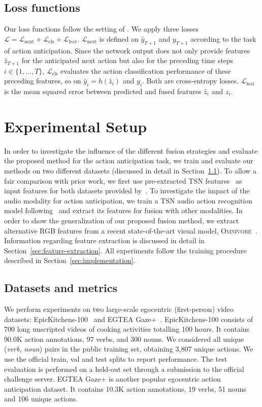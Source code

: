 \documentclass[10pt,twocolumn,letterpaper,dvipsnames]{article}
\begin{document}
\subsection{Loss functions}
\label{sec:losses}
Our loss functions follow the setting of \cite{girdharAnticipativeVideoTransformer2021}. We apply three losses $\mathcal{L} = \mathcal{L}_\mathrm{next} + \mathcal{L}_\mathrm{cls} + \mathcal{L}_\mathrm{feat}$.
$\mathcal{L}_\mathrm{next}$ is defined on $\hat{y}_{T+1}$ and $y_{T+1}$ according to the task of action anticipation. Since the network output does not only provide features $\hat{z}_{T+1}$ for the anticipated next action but also for the preceding time steps $i \in \{1,\dots,T\}$,   $\mathcal{L}_\mathrm{cls}$ evaluates the action classification performance of these preceding features, so on $\hat{y}_{i}=h(\hat{z}_i)$ and $y_{i}$. Both are cross-entropy losses. $\mathcal{L}_\mathrm{feat}$ is the mean squared error between predicted and fused features $\hat{z}_{i}$ and $z_i$.
 \section{Experimental Setup}
In order to investigate the influence of the different fusion strategies and evaluate the proposed method for the action anticipation task, we train and evaluate our methods on two different datasets (discussed in detail in Section~\ref{sec:datasets}). To allow a fair comparison with prior work, we first use pre-extracted TSN features~\cite{wangTemporalSegmentNetworks2016} as input features for both datasets provided by~\cite{furnariWhatWouldYou2019}. To investigate the impact of the audio modality for action anticipation, we train a TSN audio action recognition model following~\cite{kazakosEPICFusionAudioVisualTemporal2019} and extract its features for fusion with other modalities. In order to show the generalization of our proposed fusion method, we extract alternative RGB features from a recent state-of-the-art visual model, \textsc{Omnivore}~\cite{girdharOmnivoreSingleModel2022}. Information regarding feature extraction is discussed in detail in Section~\ref{sec:feature-extraction}. All experiments follow the training procedure described in Section~\ref{sec:implementation}.

\subsection{Datasets and metrics}
\label{sec:datasets}
We perform experiments on two large-scale egocentric (first-person) video datasets: EpicKitchens-100~\cite{damen2020epic} and EGTEA Gaze+~\cite{li2018eye}. EpicKitchens-100 consists of 700 long unscripted videos of cooking activities totalling 100 hours. It contains 90.0K action annotations, 97 verbs, and 300 nouns. We considered all unique (\textit{verb}, \textit{noun}) pairs in the public training set, obtaining 3,807 unique actions. We use the official train, val and test splits to report performance. The test evaluation is performed on a held-out set through a submission to the official challenge server. EGTEA Gaze+ is another popular egocentric action anticipation dataset. It contains 10.3K action annotations, 19 verbs, 51 nouns and 106 unique actions.
\end{document}
